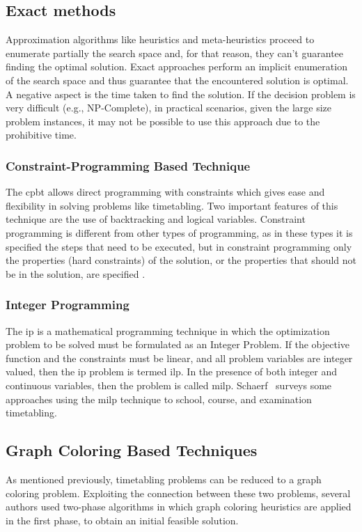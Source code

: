 \subsection{Exact methods}
\label{subsection:exactmethods}
Approximation algorithms like heuristics and meta-heuristics proceed to enumerate partially the search space and, for that reason, they can't guarantee finding the optimal solution. Exact approaches perform an implicit enumeration of the search space and thus guarantee that the encountered solution is optimal. A negative aspect is the time taken to find the solution. If the decision problem is very difficult (e.g., NP-Complete), in practical scenarios, given the large size problem instances, it may not be possible to use this approach due to the prohibitive time.\\

\subsubsection{Constraint-Programming Based Technique}
The \gls{cpbt} allows direct programming with constraints which gives ease and flexibility in solving problems like timetabling. Two important features of this technique are the use of backtracking and logical variables. Constraint programming is different from other types of programming, as in these types it is specified the steps that need to be executed, but in constraint programming only the properties (hard constraints) of the solution, or the properties that should not be in the solution, are specified \cite{Qu2009}.\\

\subsubsection{Integer Programming}
The \gls{ip} is a mathematical programming technique in which the optimization problem to be solved must be formulated as an Integer Problem. If the objective function and the constraints must be linear, and all problem variables are integer valued, then the \gls{ip} problem is termed \gls{ilp}. In the presence of both integer and continuous variables, then the problem is called \gls{milp}. Schaerf~\cite{Schaerf1999} surveys some approaches using the \gls{milp} technique to school, course, and examination timetabling.\\

\subsection{Graph Coloring Based Techniques}
\label{subsection:graphcoloring}
As mentioned previously, timetabling problems can be reduced to a graph coloring problem. Exploiting the connection between these two problems, several authors used two-phase algorithms in which graph coloring heuristics are applied in the first phase, to obtain an initial feasible solution.\\

